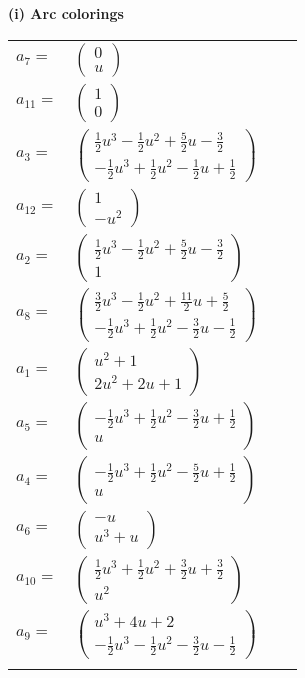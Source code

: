 \documentclass[1p]{elsarticle_modified}
\theoremstyle{definition}
\begin{document}
\flushleft \textbf{(i) Arc colorings}\\
\begin{tabular}{m{7pt} m{180pt} m{7pt} m{180pt} }
\flushright $a_{7}=$&$\begin{pmatrix}0\\u\end{pmatrix}$ \\
\flushright $a_{11}=$&$\begin{pmatrix}1\\0\end{pmatrix}$ \\
\flushright $a_{3}=$&$\begin{pmatrix}\frac{1}{2} u^3-\frac{1}{2} u^2+\frac{5}{2} u-\frac{3}{2}\\-\frac{1}{2} u^3+\frac{1}{2} u^2-\frac{1}{2} u+\frac{1}{2}\end{pmatrix}$ \\
\flushright $a_{12}=$&$\begin{pmatrix}1\\- u^2\end{pmatrix}$ \\
\flushright $a_{2}=$&$\begin{pmatrix}\frac{1}{2} u^3-\frac{1}{2} u^2+\frac{5}{2} u-\frac{3}{2}\\1\end{pmatrix}$ \\
\flushright $a_{8}=$&$\begin{pmatrix}\frac{3}{2} u^3-\frac{1}{2} u^2+\frac{11}{2} u+\frac{5}{2}\\-\frac{1}{2} u^3+\frac{1}{2} u^2-\frac{3}{2} u-\frac{1}{2}\end{pmatrix}$ \\
\flushright $a_{1}=$&$\begin{pmatrix}u^2+1\\2 u^2+2 u+1\end{pmatrix}$ \\
\flushright $a_{5}=$&$\begin{pmatrix}-\frac{1}{2} u^3+\frac{1}{2} u^2-\frac{3}{2} u+\frac{1}{2}\\u\end{pmatrix}$ \\
\flushright $a_{4}=$&$\begin{pmatrix}-\frac{1}{2} u^3+\frac{1}{2} u^2-\frac{5}{2} u+\frac{1}{2}\\u\end{pmatrix}$ \\
\flushright $a_{6}=$&$\begin{pmatrix}- u\\u^3+u\end{pmatrix}$ \\
\flushright $a_{10}=$&$\begin{pmatrix}\frac{1}{2} u^3+\frac{1}{2} u^2+\frac{3}{2} u+\frac{3}{2}\\u^2\end{pmatrix}$ \\
\flushright $a_{9}=$&$\begin{pmatrix}u^3+4 u+2\\-\frac{1}{2} u^3-\frac{1}{2} u^2-\frac{3}{2} u-\frac{1}{2}\end{pmatrix}$\\&\end{tabular}
\end{document}
